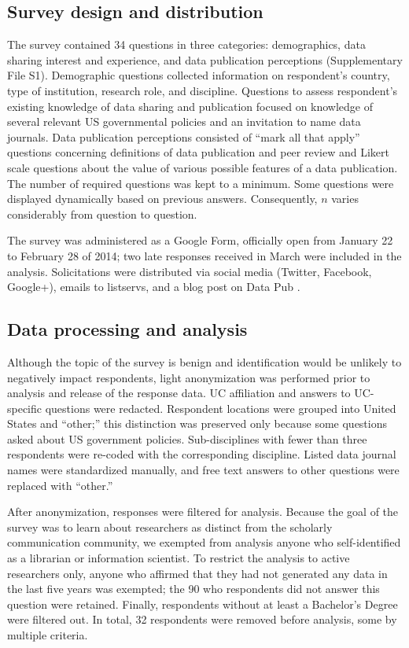 \documentclass[10pt]{article}
\begin{document}
\subsection*{Survey design and distribution}

The survey contained 34 questions in three categories: demographics, data sharing interest and experience, and data publication perceptions (Supplementary File S1).
Demographic questions collected information on respondent's country, type of institution, research role, and discipline.
Questions to assess respondent's existing knowledge of data sharing and publication focused on knowledge of several relevant US governmental policies and an invitation to name data journals.
Data publication perceptions consisted of ``mark all that apply'' questions concerning definitions of data publication and peer review and Likert scale questions about the value of various possible features of a data publication.
The number of required questions was kept to a minimum.
Some questions were displayed dynamically based on previous answers. 
Consequently, $n$ varies considerably from question to question.

The survey was administered as a Google Form, officially open from January 22 to February 28 of 2014; two late responses received in March were included in the analysis.
Solicitations were distributed via social media (Twitter, Facebook, Google+), emails to listservs, and a blog post on Data Pub \cite{kratz_data_2014}.

\subsection*{Data processing and analysis}
Although the topic of the survey is benign and identification would be unlikely to negatively impact respondents, light anonymization was performed prior to analysis and release of the response data.
UC affiliation and answers to UC-specific questions were redacted.
Respondent locations were grouped into United States and ``other;'' this distinction was preserved only because some questions asked about US government policies.  
Sub-disciplines with fewer than three respondents were re-coded with the corresponding discipline.
Listed data journal names were standardized manually, and free text answers to other questions were replaced with ``other.''

After anonymization, responses were filtered for analysis.
Because the goal of the survey was to learn about researchers as distinct from the scholarly communication community, we exempted from analysis anyone who self-identified as a librarian or information scientist.
To restrict the analysis to active researchers only, anyone who affirmed that they had not generated any data in the last five years was exempted; the 90 who respondents did not answer this question were retained.
Finally, respondents without at least a Bachelor's Degree were filtered out.
In total, 32 respondents were removed before analysis, some by multiple criteria.
\end{document}
